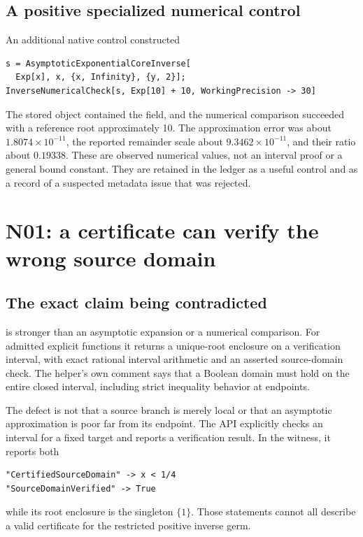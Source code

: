 \documentclass[11pt,a4paper]{article}
\newcommand{\code}[1]{\texttt{\detokenize{#1}}}
\begin{document}
\subsection{A positive specialized numerical control}
An additional native control constructed
\begin{lstlisting}
s = AsymptoticExponentialCoreInverse[
  Exp[x], x, {x, Infinity}, {y, 2}];
InverseNumericalCheck[s, Exp[10] + 10, WorkingPrecision -> 30]
\end{lstlisting}
The stored object contained the \code{"Power"} field, and the numerical comparison succeeded with a reference root approximately 10. The approximation error was about $1.8074\times10^{-11}$, the reported remainder scale about $9.3462\times10^{-11}$, and their ratio about $0.19338$. These are observed numerical values, not an interval proof or a general bound constant. They are retained in the ledger as a useful control and as a record of a suspected metadata issue that was rejected.\cite{expcore,numerical}

\section{N01: a certificate can verify the wrong source domain}
\label{sec:certificate}
\subsection{The exact claim being contradicted}
\code{InverseCertificate} is stronger than an asymptotic expansion or a numerical comparison. For admitted explicit functions it returns a unique-root enclosure on a verification interval, with exact rational interval arithmetic and an asserted source-domain check. The helper's own comment says that a Boolean domain must hold on the entire closed interval, including strict inequality behavior at endpoints.\cite{cert}

The defect is not that a source branch is merely local or that an asymptotic approximation is poor far from its endpoint. The API explicitly checks an interval for a fixed target and reports a verification result. In the witness, it reports both
\begin{lstlisting}
"CertifiedSourceDomain" -> x < 1/4
"SourceDomainVerified" -> True
\end{lstlisting}
while its root enclosure is the singleton $\{1\}$. Those statements cannot all describe a valid certificate for the restricted positive inverse germ.
\end{document}
